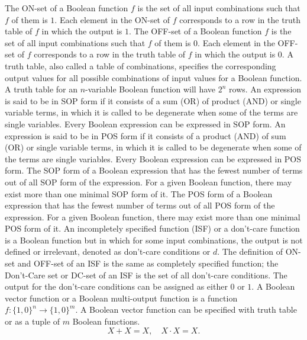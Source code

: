 \documentclass[a4paper,12pt]{report}
\begin{document}
\begin{itemize}
\begin{itemize}
\begin{itemize}
\begin{itemize}
\begin{itemize}
\begin{itemize}
\begin{itemize}
\begin{itemize}
The ON-set of a Boolean function $f$ is the set of all input combinations such that $f$ of them is $1$. Each element in the ON-set of $f$ corresponds to a row in the truth table of $f$ in which the output is $1$. The OFF-set of a Boolean function $f$ is the set of all input combinations such that $f$ of them is $0$. Each element in the OFF-set of $f$ corresponds to a row in the truth table of $f$ in which the output is $0$.
A truth table, also called a table of combinations, specifies the corresponding output values for all possible combinations of input values for a Boolean function. A truth table for an $n$-variable Boolean function will have $2^n$ rows.
An expression is said to be in SOP form if it consists of a sum (OR) of product (AND) or single variable terms, in which it is called to be degenerate when some of the terms are single variables. Every Boolean expression can be expressed in SOP form.
An expression is said to be in POS form if it consists of a product (AND) of sum (OR) or single variable terms, in which it is called to be degenerate when some of the terms are single variables. Every Boolean expression can be expressed in POS form.
The SOP form of a Boolean expression that has the fewest number of terms out of all SOP form of the expression. For a given Boolean function, there may exist more than one minimal SOP form of it.
The POS form of a Boolean expression that has the fewest number of terms out of all POS form of the expression. For a given Boolean function, there may exist more than one minimal POS form of it.
An incompletely specified function (ISF) or a don’t-care function is a Boolean function but in which for some input combinations, the output is not defined or irrelevant, denoted as don’t-care conditions or $d$. The definition of ON-set and OFF-set of an ISF is the same as completely specified function; the Don’t-Care set or DC-set of an ISF is the set of all don’t-care conditions. The output for the don’t-care conditions can be assigned as either $0$ or $1$.
A Boolean vector function or a Boolean multi-output function is a function $f\colon\{1,0\}^n\to\{1,0\}^m$. A Boolean vector function can be specified with truth table or as a tuple of $m$ Boolean functions.
\[X + X = X,\quad X\cdot X = X.\]

\end{itemize}
\end{itemize}
\end{itemize}
\end{itemize}
\end{itemize}
\end{itemize}
\end{itemize}
\end{itemize}
\end{document}
